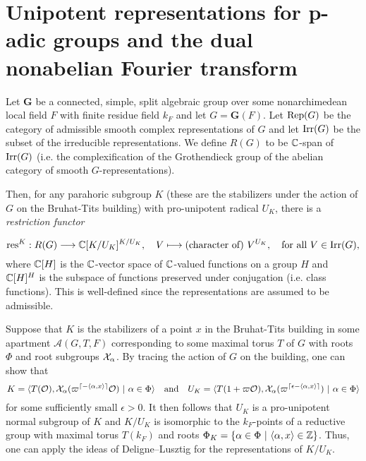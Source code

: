 \section{Unipotent representations for p-adic groups and the dual nonabelian Fourier transform}

Let $\mathbf{G}$ be a connected, simple, split algebraic group over some nonarchimedean local field $F$ with finite residue field $k_F$ and let $G=\mathbf{G}(F)$. Let $\mathrm{Rep}(G)$ be the category of admissible smooth complex representations of $G$ and let $\mathrm{Irr}(G)$ be the subset of the irreducible representations. We define $R(G)$ to be $\mathbb{C}$-span of $\mathrm{Irr}(G)$ (i.e. the complexification of the Grothendieck group of the abelian category of smooth $G$-representations).

Then, for any parahoric subgroup $K$ (these are the stabilizers under the action of $G$ on the Bruhat-Tits building) with pro-unipotent radical $U_K$, there is a \textit{restriction functor}

\begin{equation*}
    \mathrm{res}^K:R(G)\longrightarrow \mathbb{C}[K/U_K]^{K/U_K},\quad V\longmapsto \text{(character of) }V^{U_K},\quad\text{for all }V\in\mathrm{Irr}(G),
\end{equation*}
where $\mathbb{C}[H]$ is the $\mathbb{C}$-vector space of $\mathbb{C}$-valued functions on a group $H$ and $\mathbb{C}[H]^H$ is the subspace of functions preserved under conjugation (i.e. class functions). This is well-defined since the representations are assumed to be admissible. 

\begin{remark}
    Suppose that $K$ is the stabilizers of a point $x$ in the Bruhat-Tits building in some apartment $\mathcal{A}(G,T,F)$ corresponding to some maximal torus $T$ of $G$ with roots $\Phi$ and root subgroups $\mathcal{X}_\alpha$. By tracing the action of $G$ on the building, one can show that 
    $$K=\langle T(\cO),\cX_\alpha(\varpi^{\lceil-\langle\alpha,x\rangle\rceil}\cO)\ |\ \alpha\in\Phi\rangle\quad\text{and}\quad U_K=\langle T(1+\varpi\cO),\cX_\alpha(\varpi^{\lceil\epsilon-\langle\alpha,x\rangle\rceil})\ |\ \alpha\in\Phi\rangle$$
    for some sufficiently small $\epsilon>0$. It then follows that 
    $U_K$ is a pro-unipotent normal subgroup of $K$ and $K/U_K$ is isomorphic to the $k_F$-points of a reductive group with maximal torus $T(k_F)$ and roots $\Phi_K=\{\alpha\in\Phi\ |\ \langle\alpha,x\rangle\in\ZZ\}$. Thus, one can apply the ideas of Deligne--Lusztig for the representations of $K/U_K$.
\end{remark}

